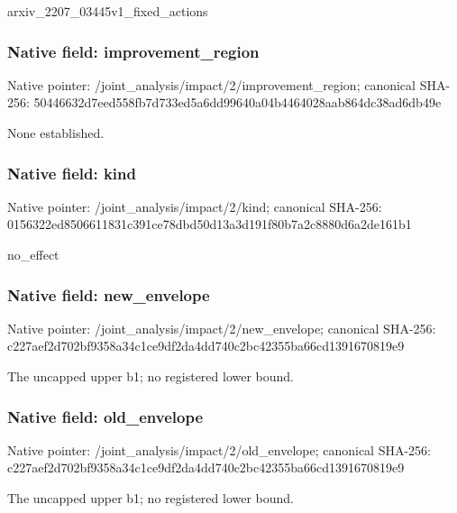 \documentclass[10pt,a4paper]{article}
\begin{document}
\begingroup\raggedright\sloppy arxiv\_\allowbreak{}2207\_\allowbreak{}03445v1\_\allowbreak{}fixed\_\allowbreak{}actions\par\endgroup

\subsubsection{Native field: improvement\_\allowbreak{}region}
Native pointer: /joint\_\allowbreak{}analysis/impact/2/improvement\_\allowbreak{}region; canonical SHA-256: 50446632d7eed558fb7d733ed5a6dd99640a04b4464028aab864dc38ad6db49e

\begingroup\raggedright\sloppy None established.\par\endgroup

\subsubsection{Native field: kind}
Native pointer: /joint\_\allowbreak{}analysis/impact/2/kind; canonical SHA-256: 0156322ed8506611831c391ce78dbd50d13a3d191f80b7a2c8880d6a2de161b1

\begingroup\raggedright\sloppy no\_\allowbreak{}effect\par\endgroup

\subsubsection{Native field: new\_\allowbreak{}envelope}
Native pointer: /joint\_\allowbreak{}analysis/impact/2/new\_\allowbreak{}envelope; canonical SHA-256: c227aef2d702bf9358a34c1ce9df2da4dd740c2bc42355ba66cd1391670819e9

\begingroup\raggedright\sloppy The uncapped upper b1;\allowbreak{} no registered lower bound.\par\endgroup

\subsubsection{Native field: old\_\allowbreak{}envelope}
Native pointer: /joint\_\allowbreak{}analysis/impact/2/old\_\allowbreak{}envelope; canonical SHA-256: c227aef2d702bf9358a34c1ce9df2da4dd740c2bc42355ba66cd1391670819e9

\begingroup\raggedright\sloppy The uncapped upper b1;\allowbreak{} no registered lower bound.\par\endgroup
\end{document}
